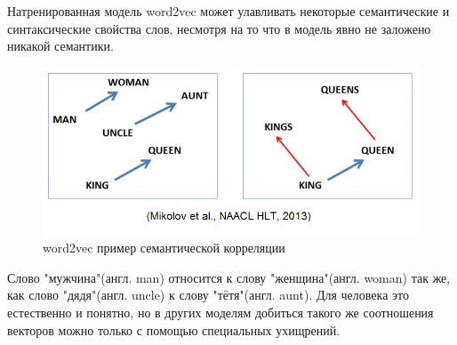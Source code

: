 Натренированная модель word2vec может улавливать некоторые семантические и синтаксические свойства слов, несмотря на то что в модель явно не заложено никакой семантики.
\begin{figure}[!h]
	\centering
	\includegraphics[width=.5\textwidth]{master_img/word2vec_example.png}
	\caption{word2vec пример семантической корреляции\cite{Book28}}
	\label{fig04_master}
\end{figure}
Слово "мужчина"(англ. man) относится к слову "женщина"(англ. woman) так же, как слово "дядя"(англ. uncle) к слову "тётя"(англ. aunt). Для человека это естественно и понятно, но в других моделям добиться такого же соотношения векторов можно только с помощью специальных ухищрений.
